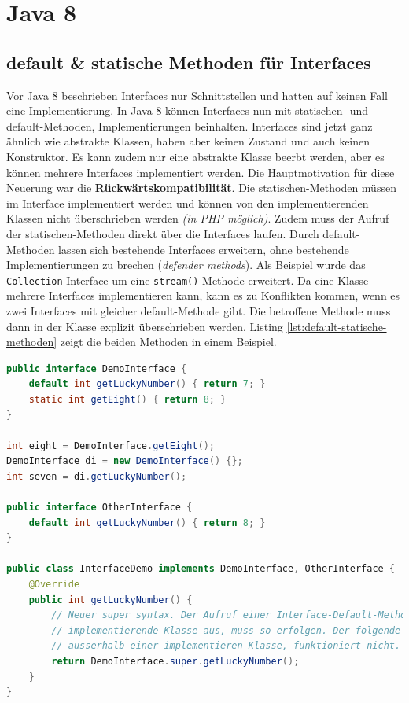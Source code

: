 \chapter{Java 8}

\section{default \& statische Methoden für Interfaces}

Vor Java 8 beschrieben Interfaces nur Schnittstellen und hatten auf keinen Fall eine Implementierung. In Java 8 können Interfaces nun mit statischen- und default-Methoden, Implementierungen beinhalten. Interfaces sind jetzt ganz ähnlich wie abstrakte Klassen, haben aber keinen Zustand und auch keinen Konstruktor. Es kann zudem nur eine abstrakte Klasse beerbt werden, aber es können mehrere Interfaces implementiert werden. Die Hauptmotivation für diese Neuerung war die \textbf{Rückwärtskompatibilität}. Die statischen-Methoden müssen im Interface implementiert werden und können von den implementierenden Klassen nicht überschrieben werden \textit{(in PHP möglich)}. Zudem muss der Aufruf der statischen-Methoden direkt über die Interfaces laufen. Durch default-Methoden lassen sich bestehende Interfaces erweitern, ohne bestehende Implementierungen zu brechen (\textit{defender methods}). Als Beispiel wurde das \verb|Collection|-Interface um eine \verb|stream()|-Methode erweitert. Da eine Klasse mehrere Interfaces implementieren kann, kann es zu Konflikten kommen, wenn es zwei Interfaces mit gleicher default-Methode gibt. Die betroffene Methode muss dann in der Klasse explizit überschrieben werden. Listing \ref{lst:default-statische-methoden} zeigt die beiden Methoden in einem Beispiel.

\begin{lstlisting}[language=Java, caption=Default- und statische Methoden, label=lst:default-statische-methoden]
public interface DemoInterface {
	default int getLuckyNumber() { return 7; }
	static int getEight() { return 8; }
}

int eight = DemoInterface.getEight();
DemoInterface di = new DemoInterface() {};
int seven = di.getLuckyNumber();

public interface OtherInterface {
	default int getLuckyNumber() { return 8; }
}

public class InterfaceDemo implements DemoInterface, OtherInterface {
	@Override
	public int getLuckyNumber() {
		// Neuer super syntax. Der Aufruf einer Interface-Default-Methode von einer 
		// implementierende Klasse aus, muss so erfolgen. Der folgende Aufruf, 
		// ausserhalb einer implementieren Klasse, funktioniert nicht.
		return DemoInterface.super.getLuckyNumber();
	} 
}
\end{lstlisting}

